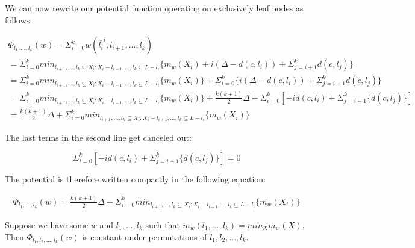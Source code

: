 We can now rewrite our potential function operating on exclusively leaf nodes as follows: 

\begin{equation*}
    \begin{gathered}
        \Phi_{l_1, ..., l_k} (w) = \Sigma_{i=0}^k w(\bar{l_i}^i, l_{i+1}, ..., l_k) \\
        = \Sigma_{i=0}^k min_{l_{i+1}, ..., l_k \subseteq X_i : X_i - l_{i+1}, ..., l_k \subseteq L - l_i} \{ m_w(X_i) + i(\Delta - d(c, l_i)) + \Sigma_{j=i+1}^k d(c, l_j)\} \\
        = \Sigma_{i=0}^k min_{l_{i+1}, ..., l_k \subseteq X_i : X_i - l_{i+1}, ..., l_k \subseteq L - l_i} \{ m_w(X_i) \} + \Sigma_{i=0}^k \{i(\Delta - d(c, l_i)) + \Sigma_{j=i+1}^k d(c, l_j)\} \\
        = \Sigma_{i=0}^k min_{l_{i+1}, ..., l_k \subseteq X_i : X_i - l_{i+1}, ..., l_k \subseteq L - l_i} \{ m_w(X_i) \} + \frac{k(k+1)}{2}\Delta + \Sigma_{i=0}^k [- i d(c, l_i) + \Sigma_{j=i+1}^k \{d(c, l_j)\}] \\
        = \frac{k(k+1)}{2}\Delta + \Sigma_{i=0}^k min_{l_{i+1}, ..., l_k \subseteq X_i : X_i - l_{i+1}, ..., l_k \subseteq L - l_i} \{ m_w(X_i)\}
    \end{gathered}
\end{equation*}

The last terms in the second line get canceled out:

\begin{equation*}
    \Sigma_{i=0}^k [- i d(c, l_i) + \Sigma_{j=i+1}^k \{d(c, l_j)\}] = 0
\end{equation*}

The potential is therefore written compactly in the following equation:

\begin{equation}
    \begin{gathered}
        \label{eq:repotential}
        \Phi_{l_1, ..., l_k} (w) = \frac{k(k+1)}{2}\Delta + \Sigma_{i=0}^k min_{l_{i+1}, ..., l_k \subseteq X_i : X_i - l_{i+1}, ..., l_k \subseteq L - l_i} \{ m_w(X_i)\}
    \end{gathered}
\end{equation}

\begin{lemma}
    Suppose we have some $w$ and $l_1, ..., l_k$ such that $m_w(l_1, ..., l_k) = min_X m_w(X)$. Then $\Phi_{l_1, l_2, ..., l_k}(w)$ is constant under permutations of $l_1, l_2, ..., l_k$.
\end{lemma}

